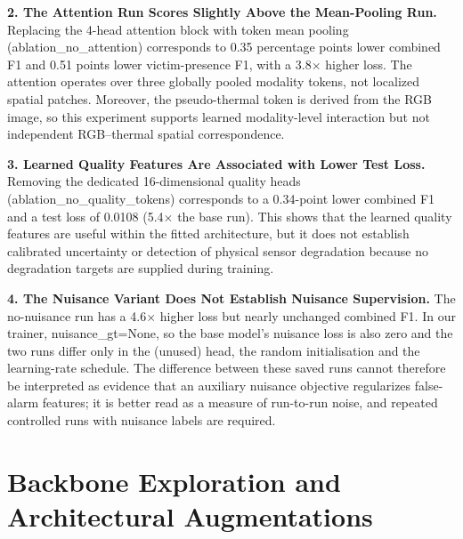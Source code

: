 \textbf{2. The Attention Run Scores Slightly Above the Mean-Pooling Run.}
Replacing the 4-head attention block with token mean pooling (ablation\_no\_attention) corresponds to 0.35 percentage points lower combined F1 and 0.51 points lower victim-presence F1, with a 3.8$\times$ higher loss. The attention operates over three globally pooled modality tokens, not localized spatial patches. Moreover, the pseudo-thermal token is derived from the RGB image, so this experiment supports learned modality-level interaction but not independent RGB--thermal spatial correspondence.

\textbf{3. Learned Quality Features Are Associated with Lower Test Loss.}
Removing the dedicated 16-dimensional quality heads (ablation\_no\_quality\_tokens) corresponds to a 0.34-point lower combined F1 and a test loss of 0.0108 (5.4$\times$ the base run). This shows that the learned quality features are useful within the fitted architecture, but it does not establish calibrated uncertainty or detection of physical sensor degradation because no degradation targets are supplied during training.

\textbf{4. The Nuisance Variant Does Not Establish Nuisance Supervision.}
The no-nuisance run has a 4.6$\times$ higher loss but nearly unchanged combined F1. In our trainer, nuisance\_gt=None, so the base model's nuisance loss is also zero and the two runs differ only in the (unused) head, the random initialisation and the learning-rate schedule. The difference between these saved runs cannot therefore be interpreted as evidence that an auxiliary nuisance objective regularizes false-alarm features; it is better read as a measure of run-to-run noise, and repeated controlled runs with nuisance labels are required.

\section{Backbone Exploration and Architectural Augmentations}
\label{sec:backbone_variants}

